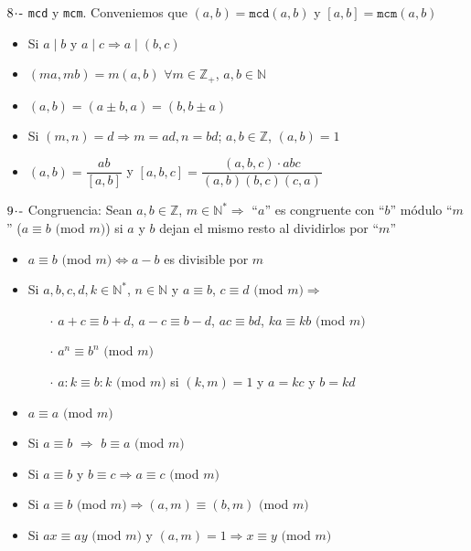 \vspace{0.5cm}

$8\hspace{-0.05cm}\cdot\hspace{-0.05cm}\text{-}$ \texttt{mcd} y \texttt{mcm}. Conveniemos que $(a,b) = \texttt{mcd}(a,b)$ y $[a,b]= \texttt{mcm}(a,b)$
\begin{itemize}
    \def\labelitemi{-}
    \addtolength{\itemindent}{1cm}
    \item Si $a \mid b$ y $a \mid c \Longrightarrow a \mid (b,c)$
    \item $(ma, mb) = m(a,b)$ $\forall m \in \mathbb{Z}_+$, $a,b \in \mathbb{N}$
    \item $(a,b)=(a \pm b, a) = (b, b \pm a)$
    \item Si $(m,n) = d \Longrightarrow m = ad, n= bd$; $a,b \in \mathbb{Z}$, $(a,b) = 1$
    \item $(a,b) = \dfrac{ab}{[a,b]}$ y $[a,b,c] = \dfrac{(a,b,c)\cdot abc}{(a,b)(b,c)(c,a)}$
\end{itemize}

\vspace{0.5cm}

$9\hspace{-0.05cm}\cdot\hspace{-0.05cm}\text{-}$ Congruencia: Sean $a,b \in \mathbb{Z}$, $m \in \mathbb{N}^* \Longrightarrow$ ``$a$'' es congruente con ``$b$'' módulo ``$m$'' ($a \equiv b$ $($mod $m)$) si $a$ y $b$ dejan el mismo resto al dividirlos por ``$m$''
\begin{itemize}
    \def\labelitemi{-}
    \addtolength{\itemindent}{1cm}
    \item $a \equiv b$ $($mod $m) \Longleftrightarrow a - b$ es divisible por $m$
    \item Si $a,b,c,d,k \in \mathbb{N}^*$, $n \in \mathbb{N}$ y $a \equiv b$, $c \equiv d$ $($mod $m) \Longrightarrow$
        \begin{itemize}
            \addtolength{\itemindent}{1cm}
            \item[$\cdot$] $a+c \equiv b+d$, $a-c \equiv b-d$, $ac \equiv bd$, $ka \equiv kb$ $($mod $m)$
            \item[$\cdot$] $a^n \equiv b^n$ $($mod $m)$
            \item[$\cdot$] $a:k \equiv b:k$ $($mod $m)$ si $(k,m)=1$ y $a = kc$ y $b = kd$
        \end{itemize}
    \item $a \equiv a$ $($mod $m)$
    \item Si $a \equiv b$ $\Longrightarrow$ $b \equiv a$ $($mod $m)$
    \item Si $a \equiv b$ y $b \equiv c \Longrightarrow a \equiv c$ $($mod $m)$
    \item Si $a \equiv b$ $($mod $m) \Longrightarrow (a,m) \equiv (b,m)$ $($mod $m)$
    \item Si $ax \equiv ay$ $($mod $m)$ y $(a,m) = 1 \Longrightarrow x \equiv y$  $($mod $m)$
\end{itemize}


